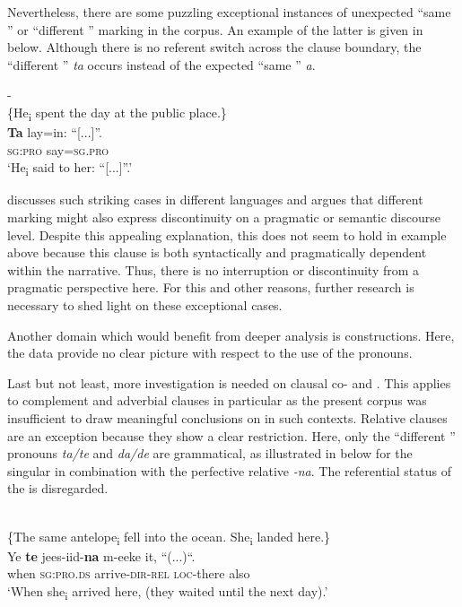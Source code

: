 \documentclass[output=paper
,newtxmath
,modfonts
,nonflat]{langsci/langscibook}
\begin{document}
Nevertheless, there are some puzzling exceptional instances of unexpected “same ” or “different ” marking in the corpus. An example of the latter is given in  below. Although there is no referent switch across the clause boundary, the “different ”  \textit{ta} occurs instead of the expected “same ”  \textit{a}.

\ea\label{ex:apel:23}
{- \citep[284]{Faye1979}}\\
{\-\hspace{0cm}\{He\textsubscript{i} spent the day at the public place.\}}\\
\gll   \textbf{Ta} lay=in: “[...]”. \\
     \textsc{sg:pro} say\textsc{=sg.pro} \\
\glt ‘He\textsubscript{i} said to her: “[...]”.’
\z

\citet[98-114]{Stirling1993} discusses such striking cases in different languages and argues that different  marking might also express discontinuity on a pragmatic or semantic discourse level. Despite this appealing explanation, this does not seem to hold in example  above because this clause is both syntactically and pragmatically dependent within the narrative. Thus, there is no interruption or discontinuity from a pragmatic perspective here. For this and other reasons, further research is necessary to shed light on these exceptional cases.

Another domain which would benefit from deeper analysis is  constructions. Here, the data provide no clear picture with respect to the use of the  pronouns.

Last but not least, more investigation is needed on clausal co- and . This applies to complement and adverbial clauses in particular as the present corpus was insufficient to draw meaningful conclusions on  in such contexts. Relative clauses are an exception because they show a clear restriction. Here, only the “different ” pronouns \textit{ta/te} and \textit{da/de} are grammatical, as illustrated in  below for the singular in combination with the perfective relative \textit{-na}. The referential status of the  is disregarded.

\ea\label{ex:apel:24}
{  \citep[350]{Renaudier2012}}\\
{\-\hspace{0cm}\{The same antelope\textsubscript{i} fell into the ocean. She\textsubscript{i} landed here.\}} \\
\gll   Ye \textbf{te} jees-iid-\textbf{na} m-eeke it, “(...)“.\\
     when \textsc{sg:pro.ds} arrive\textsc{-dir-rel} \textsc{loc-}there also \\
\glt ‘When she\textsubscript{i} arrived here, (they waited until the next day).’
\z
\end{document}
